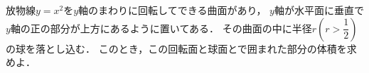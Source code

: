 \documentclass[../../main.tex]{subfiles}
\begin{document}
放物線$y=x^2$を$y$軸のまわりに回転してできる曲面があり，
$y$軸が水平面に垂直で$y$軸の正の部分が上方にあるように置いてある．
その曲面の中に半径$r \left(r>\dfrac{1}{2}\right)$の球を落とし込む．
このとき，この回転面と球面とで囲まれた部分の体積を求めよ．
\end{document}
